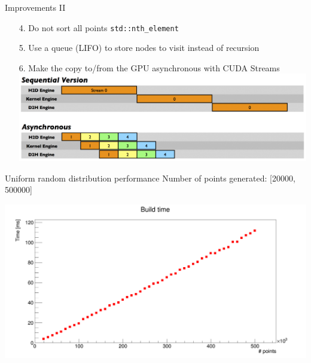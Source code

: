 \documentclass{beamer}
\newenvironment{changemargin}[2]{%
  \begin{list}{}{%
    \setlength{\topsep}{0pt}%
    \setlength{\leftmargin}{#1}%
    \setlength{\rightmargin}{#2}%
    \setlength{\listparindent}{\parindent}%
    \setlength{\itemindent}{\parindent}%
    \setlength{\parsep}{\parskip}%
  }%
  \item[]}{\end{list}}
\begin{document}
\begin{frame}{Improvements II}
\vspace{5mm}
\begin{enumerate}
\item [4.] Do not sort all points \texttt{std::nth\_element}
\end{enumerate}
\vspace{5mm}
\begin{enumerate}
\item [5.] Use a queue (LIFO) to store nodes to visit instead of recursion
\end{enumerate}
\vspace{5mm}
\begin{enumerate}
\item [6.] Make the copy to/from the GPU asynchronous with CUDA Streams
\includegraphics[scale=0.25]{images/cuda_streams.png}
\end{enumerate}

\end{frame}

\begin{frame}{Uniform random distribution performance}
Number of points generated: [20000, 500000]\\
\begin{changemargin}{-2cm}{-2cm}
\begin{center}
\includegraphics[scale=0.2]{images/fkdBuildTimes.png}
\end{center}
\end{changemargin}
\end{frame}
\end{document}
